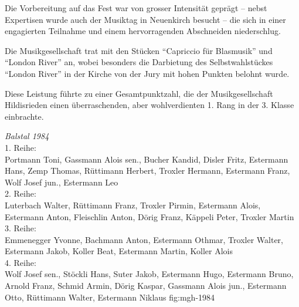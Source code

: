 \begin{history}
    Die Vorbereitung auf das Fest war von grosser Intensität geprägt -- nebst
    Expertisen wurde auch der Musiktag in Neuenkirch besucht -- die sich in
    einer engagierten Teilnahme und einem hervorragenden Abschneiden
    niederschlug.

    Die Musikgesellschaft trat mit den Stücken \enquote{Capriccio für Blasmusik}
    und \enquote{London River} an, wobei besonders die Darbietung des
    Selbstwahlstückes \enquote{London River} in der Kirche von der Jury mit
    hohen Punkten belohnt wurde.

    Diese Leistung führte zu einer Gesamtpunktzahl, die der Musikgesellschaft
    Hildisrieden einen überraschenden, aber wohlverdienten 1. Rang in der 3.
    Klasse einbrachte.

\end{history}

{\emph{Balstal 1984}\\
    1. Reihe:\\
    Portmann Toni, Gassmann Alois sen., Bucher Kandid, Disler Fritz, Estermann
    Hans, Zemp Thomas, Rüttimann Herbert, Troxler Hermann, Estermann Franz, Wolf
    Josef jun., Estermann Leo\\
    2. Reihe:\\
    Luterbach Walter, Rüttimann Franz, Troxler Pirmin, Estermann Alois,
    Estermann Anton, Fleischlin Anton, Dörig Franz, Käppeli Peter, Troxler
    Martin\\
    3. Reihe:\\
    Emmenegger Yvonne, Bachmann Anton, Estermann Othmar, Troxler Walter,
    Estermann Jakob, Koller Beat, Estermann Martin, Koller Alois\\
    4. Reihe:\\
    Wolf Josef sen., Stöckli Hans, Suter Jakob, Estermann Hugo, Estermann Bruno,
    Arnold Franz, Schmid Armin, Dörig Kaspar, Gassmann Alois jun., Estermann
    Otto, Rüttimann Walter, Estermann Niklaus } {fig:mgh-1984}

